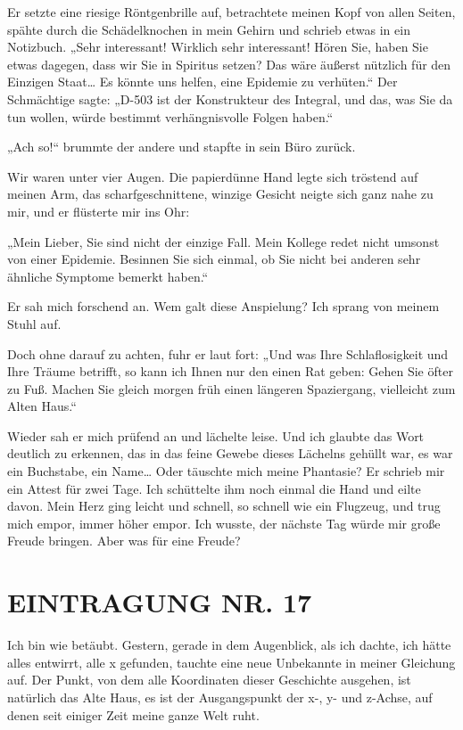Er setzte eine riesige Röntgenbrille auf, betrachtete meinen Kopf
von allen Seiten, spähte durch die Schädelknochen in mein Gehirn
und schrieb etwas in ein Notizbuch. „Sehr interessant! Wirklich
sehr interessant! Hören Sie, haben Sie etwas dagegen, dass wir Sie
in Spiritus setzen? Das wäre äußerst nützlich für den Einzigen
Staat\ldots{} Es könnte uns helfen, eine Epidemie zu verhüten.“ Der
Schmächtige sagte: „D-503 ist der Konstrukteur des Integral, und
das, was Sie da tun wollen, würde bestimmt verhängnisvolle Folgen
haben.“

„Ach so!“ brummte der andere und stapfte in sein Büro zurück.

Wir waren unter vier Augen. Die papierdünne Hand legte sich
tröstend auf meinen Arm, das scharfgeschnittene, winzige Gesicht
neigte sich ganz nahe zu mir, und er flüsterte mir ins Ohr:

„Mein Lieber, Sie sind nicht der einzige Fall. Mein Kollege redet
nicht umsonst von einer Epidemie. Besinnen Sie sich einmal, ob Sie
nicht bei anderen sehr ähnliche Symptome bemerkt haben.“

Er sah mich forschend an. Wem galt diese Anspielung? Ich sprang von
meinem Stuhl auf.

Doch ohne darauf zu achten, fuhr er laut fort: „Und was Ihre
Schlaflosigkeit und Ihre Träume betrifft, so kann ich Ihnen nur den
einen Rat geben: Gehen Sie öfter zu Fuß. Machen Sie gleich morgen
früh einen längeren Spaziergang, vielleicht zum Alten Haus.“

Wieder sah er mich prüfend an und lächelte leise. Und ich glaubte
das Wort deutlich zu erkennen, das in das feine Gewebe dieses
Lächelns gehüllt war, es war ein Buchstabe, ein Name\ldots{} Oder
täuschte mich meine Phantasie? Er schrieb mir ein Attest für zwei
Tage. Ich schüttelte ihm noch einmal die Hand und eilte davon. Mein
Herz ging leicht und schnell, so schnell wie ein Flugzeug, und trug
mich empor, immer höher empor. Ich wusste, der nächste Tag würde
mir große Freude bringen. Aber was für eine Freude?

\section{EINTRAGUNG NR. 17}

Ich bin wie betäubt. Gestern, gerade in dem Augenblick, als ich
dachte, ich hätte alles entwirrt, alle x gefunden, tauchte eine
neue Unbekannte in meiner Gleichung auf. Der Punkt, von dem alle
Koordinaten dieser Geschichte ausgehen, ist natürlich das Alte
Haus, es ist der Ausgangspunkt 
der x-, y- und z-Achse, auf denen seit einiger Zeit meine
ganze Welt ruht.

